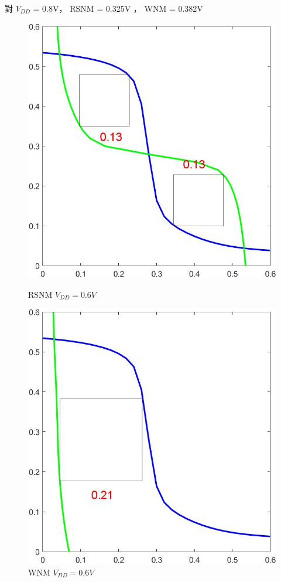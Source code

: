 \documentclass{article}
\begin{document}
\vspace*{-1cm}
對 $V_{DD}$ = 0.8V， RSNM = 0.325V ， WNM = 0.382V

\begin{figure}[H]
\centering
\begin{minipage}[t]{0.28\textwidth}
\centering
    \includegraphics[width=\textwidth]{./img/2023-11-12-04-32-57.png}
\caption{RSNM $V_{DD} = 0.6V$}
\label{8rsnm06}
\end{minipage}
\qquad
\begin{minipage}[t]{0.28\textwidth}
\centering
    \includegraphics[width=\textwidth]{./img/2023-11-12-04-33-12.png}
\caption{WNM $V_{DD} = 0.6V$}
\label{8wnm06}
\end{minipage}
\end{figure}
\end{document}
